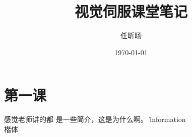 \documentclass[12pt]{article}
\title{视觉伺服课堂笔记}
\author{任昕旸}
\date{\today}
\begin{document}
\maketitle
\section{第一课}
感觉老师讲的都 是一些简介，这是为什么啊。
\H information\\
\K 楷体
\end{document}
